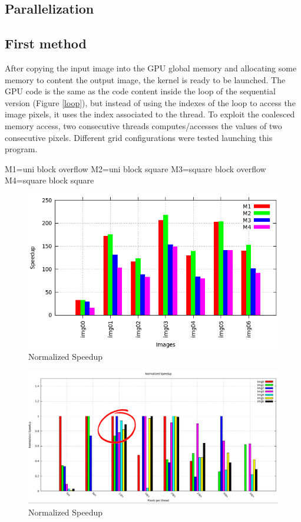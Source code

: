 \documentclass[a4paper]{article}
\begin{document}
\subsection{Parallelization}
\label{sec:p1}
\subsection{First method}
\label{sec:fm}
After copying the input image into the GPU global memory and allocating some memory to content the output image, the kernel is ready to be launched. The GPU code is the same as the code content inside the loop of the sequential version (Figure \ref{loop}), but instead of using the indexes of the loop to access the image pixels, it uses the index associated to the thread. To exploit the coalesced memory access, two consecutive threads computes/accesses the values of two consecutive pixels. Different grid configurations were tested launching this program. 


M1=uni block overflow M2=uni block square M3=square block overflow M4=square block square
\begin{figure}[ht]
    \centering
    \includegraphics[width=0.9\linewidth]{res/darker_histo}
    \caption{Normalized Speedup}
    \label{fig:histo_darker}
\end{figure}
\FloatBarrier

\begin{figure}[ht]
    \centering
    \includegraphics[width=0.9\linewidth]{res/histogram_darker}
    \caption{Normalized Speedup}
    \label{fig:norm_histo_darker}
\end{figure}
\FloatBarrier
\end{document}
